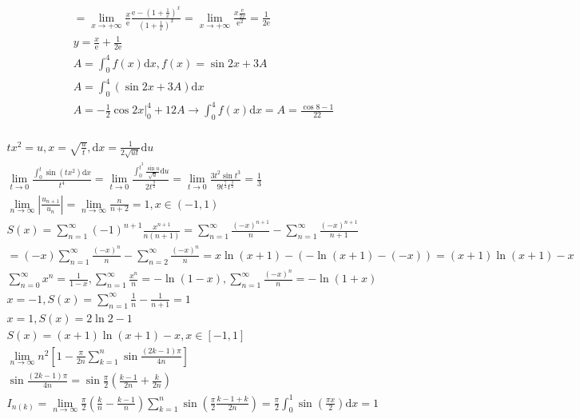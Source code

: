 \documentclass{article}
\begin{document}
\begin{align*}
    = \lim_{x \to +\infty} \frac{x}{\mathrm{e}} \frac{\mathrm{e}-\left(1+\frac{1}{x}\right)^{x}}{\left(1+\frac{1}{x}\right)^{x}} =\lim_{x \to +\infty}\frac{x\frac{\mathrm{e}}{2x}}{\mathrm{e}^{2}} = \frac{1}{2\mathrm{e}}\\
    y = \frac{x}{\mathrm{e}}+\frac{1}{2\mathrm{e}}\\
    A = \int_{0}^{4}f(x)\mathrm{d}x ,f(x) = \sin 2x+3A \\ 
    A = \int_{0}^{4} (\sin 2x +3A )\mathrm{d}x \\
    A = -\frac{1}{2} \cos 2x |_{0}^{4} + 12A \rightarrow \int_{0}^{4}f(x)\mathrm{d}x = A = \frac{\cos 8-1}{22}\\ 
\end{align*}

\clearpage
\begin{align*}
    tx^2 = u , x = \sqrt{\frac{u}{t}} , \mathrm{d}x = \frac{1}{2\sqrt{ut}}\mathrm{d}u \\ 
    \lim_{t \to 0}\frac{\int_{0}^{t}\sin(tx^2)\mathrm{d}x}{t^4} = \lim_{t \to 0} \frac{\int_{0}^{t^{3}} \frac{\sin u}{\sqrt{u}}\mathrm{d}u}{2t^{\frac{9}{2}}} = \lim_{t \to 0} \frac{3t^2\sin t^3}{9t^{\frac{7}{2}}t^{\frac{3}{2}}} = \frac{1}{3}\\
    \lim_{n \to \infty} \left|\frac{u_{n+1}}{u_{n}}\right| = \lim_{n \to \infty} \frac{n}{n+2} = 1 ,x \in (-1,1) \\
    S(x) = \sum_{n=1}^{\infty} (-1)^{n+1}\frac{x^{n+1}}{n(n+1)} = \sum_{n=1}^{\infty} \frac{(-x)^{n+1}}{n} - \sum_{n=1}^{\infty} \frac{(-x)^{n+1}}{n+1} \\
    = (-x)\sum_{n=1}^{\infty} \frac{(-x)^{n}}{n} - \sum_{n=2}^{\infty} \frac{(-x)^{n}}{n} = x\ln(x+1) - \left(-\ln(x+1)-(-x)\right) = (x+1)\ln(x+1)-x \\
    \sum_{n=0}^{\infty} x^{n} = \frac{1}{1-x} ,\sum_{n=1}^{\infty} \frac{x^n}{n} = -\ln(1-x),\sum_{n=1}^{\infty} \frac{(-x)^n}{n} = -\ln(1+x) \\
    x = -1 , S(x) = \sum_{n=1}^{\infty} \frac{1}{n}-\frac{1}{n+1} = 1\\
    x = 1 , S(x) = 2\ln2-1 \\
    S(x) = (x+1)\ln(x+1)-x , x\in [-1,1] \\ 
    \lim_{n \to \infty} n^2\left[1-\frac{\pi}{2n}\sum_{k=1}^{n}\sin\frac{(2k-1)\pi}{4n}\right]\\
    \sin\frac{(2k-1)\pi}{4n} = \sin \frac{\pi}{2}\left(\frac{k-1}{2n}+\frac{k}{2n}\right)\\
    I_{n(k)} = \lim_{n \to \infty} \frac{\pi}{2} \left(\frac{k}{n}-\frac{k-1}{n}\right) \sum_{k=1}^{n}\sin(\frac{\pi}{2}\frac{k-1+k}{2n}) = \frac{\pi}{2}\int_{0}^{1}\sin(\frac{\pi x}{2})\mathrm{d}x = 1 \\ 

\end{align*}
\end{document}
